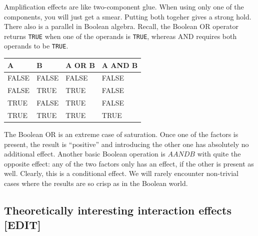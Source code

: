 \documentclass[]{svmono}
\newenvironment{Shaded}{\begin{snugshade}}{\end{snugshade}}
\newcommand{\KeywordTok}[1]{\textcolor[rgb]{0.13,0.29,0.53}{\textbf{#1}}}
\newcommand{\DataTypeTok}[1]{\textcolor[rgb]{0.13,0.29,0.53}{#1}}
\newcommand{\StringTok}[1]{\textcolor[rgb]{0.31,0.60,0.02}{#1}}
\newcommand{\OperatorTok}[1]{\textcolor[rgb]{0.81,0.36,0.00}{\textbf{#1}}}
\newcommand{\NormalTok}[1]{#1}
\begin{document}
Amplification effects are like two-component glue. When using only one
of the components, you will just get a smear. Putting both togeher gives
a strong hold. There also is a parallel in Boolean algebra. Recall, the
Boolean OR operator returns \texttt{TRUE} when one of the operands is
\texttt{TRUE}, whereas AND requires both operands to be \texttt{TRUE}.

\begin{Shaded}
\end{Shaded}

\begin{tabular}{l|l|l|l}
\hline
A & B & A OR B & A AND B\\
\hline
FALSE & FALSE & FALSE & FALSE\\
\hline
FALSE & TRUE & TRUE & FALSE\\
\hline
TRUE & FALSE & TRUE & FALSE\\
\hline
TRUE & TRUE & TRUE & TRUE\\
\hline
\end{tabular}

The Boolean OR is an extreme case of saturation. Once one of the factors
is present, the result is ``positive'' and introducing the other one has
absolutely no additional effect. Another basic Boolean operation is
\(A AND B\) with quite the opposite effect: any of the two factors only
has an effect, if the other is present as well. Clearly, this is a
conditional effect. We will rarely encounter non-trivial cases where the
results are so crisp as in the Boolean world.

\subsection{Theoretically interesting interaction effects
{[}EDIT{]}}\label{theoretically-interesting-interaction-effects-edit}
\end{document}
